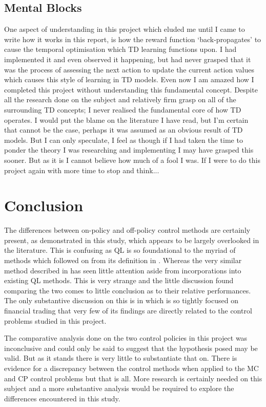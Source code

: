 \documentclass[hidelinks,journal]{IEEEtran}
\begin{document}
\subsection{Mental Blocks}
One aspect of understanding in this project which eluded me until I came to write how it works in this report, is how the reward function ‘back-propagates’ to cause the temporal optimisation which TD learning functions upon. I had implemented it and even observed it happening, but had never grasped that it was the process of assessing the next action to update the current action values which causes this style of learning in TD models. Even now I am amazed how I completed this project without understanding this fundamental concept. Despite all the research done on the subject and relatively firm grasp on all of the surrounding TD concepts; I never realised the fundamental core of how TD operates. I would put the blame on the literature I have read, but I’m certain that cannot be the case, perhaps it was assumed as an obvious result of TD models. But I can only speculate, I feel as though if I had taken the time to ponder the theory I was researching and implementing I may have grasped this sooner. But as it is I cannot believe how much of a fool I was. If I were to do this project again with more time to stop and think...
\section{Conclusion}
\label{sec:conclusion}
The differences between on-policy and off-policy control methods are certainly present, as demonstrated in this study, which appears to be largely overlooked in the literature. This is confusing as QL is so foundational to the myriad of methods which followed on from its definition in \textcite{Watkins89}. Whereas the very similar method described in \textcite{Rummery94} has seen little attention aside from incorporations into existing QL methods. This is very strange and the little discussion found comparing the two comes to little conclusion as to their relative performances. The only substantive discussion on this is in \textcite{Corozza15} which is so tightly focused on financial trading that very few of its findings are directly related to the control problems studied in this project.

The comparative analysis done on the two control policies in this project was inconclusive and could only be said to suggest that the hypothesis posed may be valid. But as it stands there is very little to substantiate that on. There is evidence for a discrepancy between the control methods when applied to the MC and CP control problems but that is all. More research is certainly needed on this subject and a more substantive analysis would be required to explore the differences encountered in this study.
\end{document}
